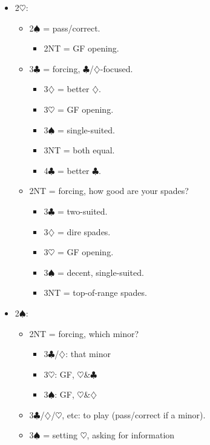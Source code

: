 \documentclass[a4paper,12pt]{article}
\begin{document}
\begin{itemize}
\item 2$\heartsuit$:
	\begin{itemize}
   \item 2$\spadesuit$ = pass/correct.
		\begin{itemize}
      \item 2NT = GF opening.
		\end{itemize}
   \item 3$\clubsuit$ = forcing, $\clubsuit$/$\diamondsuit$-focused.
		\begin{itemize}
      \item 3$\diamondsuit$ = better $\diamondsuit$.
      \item 3$\heartsuit$ = GF opening.
      \item 3$\spadesuit$ = single-suited.
      \item 3NT = both equal.
      \item 4$\clubsuit$ = better $\clubsuit$.
		\end{itemize}
   \item 2NT = forcing, how good are your spades?
		\begin{itemize}
      \item 3$\clubsuit$ = two-suited.
      \item 3$\diamondsuit$ = dire spades.
      \item 3$\heartsuit$ = GF opening.
      \item 3$\spadesuit$ = decent, single-suited.
      \item 3NT = top-of-range spades.
		\end{itemize}
	\end{itemize}

\item 2$\spadesuit$:
	\begin{itemize}
   \item 2NT = forcing, which minor?
		\begin{itemize}
      \item 3$\clubsuit$/$\diamondsuit$: that minor
      \item 3$\heartsuit$: GF, $\heartsuit$\&$\clubsuit$
      \item 3$\spadesuit$: GF, $\heartsuit$\&$\diamondsuit$
		\end{itemize}
   \item 3$\clubsuit$/$\diamondsuit$/$\heartsuit$, etc: to play (pass/correct if a minor).
   \item 3$\spadesuit$ = setting $\heartsuit$, asking for information
	\end{itemize}


\end{itemize}
\end{document}
